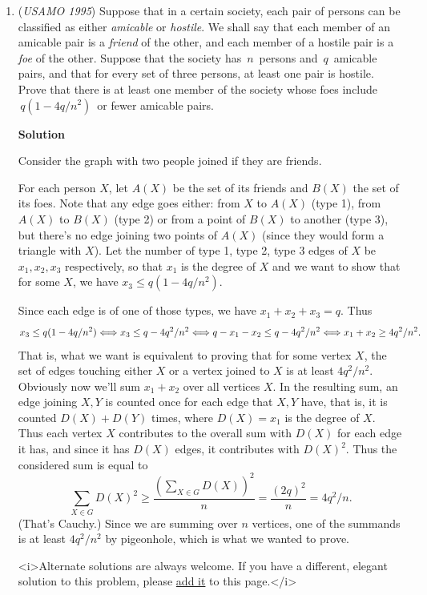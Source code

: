 \begin{enumerate}
 Now for any $y$ we have $kQ(y)\equiv kQ(x)\equiv kq_x \equiv kq_y\pmod{x-y}$ for any $x>L$. Since $x-y$ can be arbitrarily large, we must have $Q(y)=q_y$, as needed.

 


	\item (\textit{USAMO 1995}) Suppose that in a certain society, each pair of persons can be classified as either \textit{amicable} or \textit{hostile}. We shall say that each member of an amicable pair is a \textit{friend} of the other, and each member of a hostile pair is a \textit{foe} of the other.  Suppose that the society has $\, n \,$ persons and $\, q \,$ amicable pairs, and that for every set of three persons, at least one pair is hostile.  Prove that there is at least one member of the society whose foes include $\, q(1 - 4q/n^2) \,$ or fewer amicable pairs.  


 



\textbf{Solution}

Consider the graph with two people joined if they are friends.

 For each person $X$, let $A(X)$ be the set of its friends and $B(X)$ the set of its foes. Note that any edge goes either: from $X$ to $A(X)$ (type 1), from $A(X)$ to $B(X)$ (type 2) or from a point of $B(X)$ to another (type 3), but there's no edge joining two points of $A(X)$ (since they would form a triangle with $X$). Let the number of type 1, type 2, type 3 edges of $X$ be $x_1, x_2, x_3$ respectively, so that $x_1$ is the degree of $X$ and we want to show that for some $X$, we have $x_3 \leq q(1-4q/n^2)$.

 Since each edge is of one of those types, we have $x_1+x_2+x_3=q$. Thus
 \[x_3 \leq q(1-4q/n^2) \Longleftrightarrow \\ x_3 \leq q-4q^2/n^2 \Longleftrightarrow \\ q-x_1-x_2 \leq q-4q^2/n^2 \Longleftrightarrow \\ x_1+x_2 \geq 4q^2/n^2.\]That is, what we want is equivalent to proving that for some vertex $X$, the set of edges touching either $X$ or a vertex joined to $X$ is at least $4q^2/n^2$. Obviously now we'll sum $x_1+x_2$ over all vertices $X$. In the resulting sum, an edge joining $X, Y$ is counted once for each edge that $X, Y$ have, that is, it is counted $D(X)+D(Y)$ times, where $D(X)=x_1$ is the degree of $X$. Thus each vertex $X$ contributes to the overall sum with $D(X)$ for each edge it has, and since it has $D(X)$ edges, it contributes with $D(X)^2$. Thus the considered sum is equal to
 \[\sum_{X \in G} D(X)^2 \geq \frac{(\sum_{X \in G} D(X))^2}{n}=\frac{(2q)^2}{n}=4q^2/n.\](That's Cauchy.) Since we are summing over $n$ vertices, one of the summands is at least $4q^2/n^2$ by pigeonhole, which is what we wanted to prove.

 <i>Alternate solutions are always welcome. If you have a different, elegant solution to this problem, please \href{https://artofproblemsolving.com/wiki/index.php?title=1995\_USAMO\_Problems/Problem\_5&action=edit}{add it} to this page.</i>



\end{enumerate}